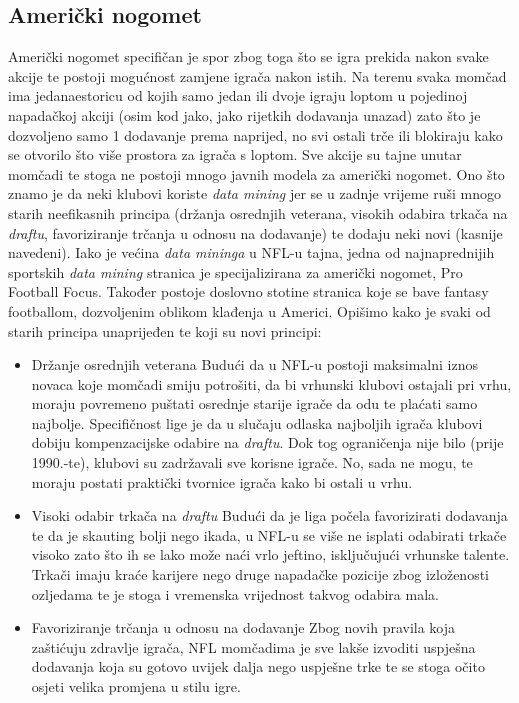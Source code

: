 \documentclass{ferseminar}
\begin{document}
\subsection{Američki nogomet}
Američki nogomet specifičan je spor zbog toga što se igra prekida nakon svake akcije te postoji mogućnost zamjene igrača nakon istih. Na terenu svaka momčad ima jedanaestoricu od kojih samo jedan ili dvoje igraju loptom u pojedinoj napadačkoj akciji (osim kod jako, jako rijetkih dodavanja unazad) zato što je dozvoljeno samo 1 dodavanje prema naprijed, no svi ostali trče ili blokiraju kako se otvorilo što više prostora za igrača s loptom. Sve akcije su tajne unutar momčadi te stoga ne postoji mnogo javnih modela za američki nogomet. Ono što znamo je da neki klubovi koriste \textit{data mining} jer se u zadnje vrijeme ruši mnogo starih neefikasnih principa (držanja osrednjih veterana, visokih odabira trkača na \textit{draftu}, favoriziranje trčanja u odnosu na dodavanje) te dodaju neki novi (kasnije navedeni).
\newline
Iako je većina \textit{data mininga} u NFL-u tajna, jedna od najnaprednijih sportskih \textit{data mining} stranica je specijalizirana za američki nogomet, Pro Football Focus. Također postoje doslovno stotine stranica koje se bave fantasy footballom, dozvoljenim oblikom klađenja u Americi.
\newline
Opišimo kako je svaki od starih principa unaprijeđen te koji su novi principi:
\begin{itemize}
	\item Držanje osrednjih veterana \cite{ringer_age}
	\newline
	Budući da u NFL-u postoji maksimalni iznos novaca koje momčadi smiju potrošiti, da bi vrhunski klubovi ostajali pri vrhu, moraju povremeno puštati osrednje starije igrače da odu te plaćati samo najbolje. Specifičnost lige je da u slučaju odlaska najboljih igrača klubovi dobiju kompenzacijske odabire na \textit{draftu}. Dok tog ograničenja nije bilo (prije 1990.-te), klubovi su zadržavali sve korisne igrače. No, sada ne mogu, te moraju postati praktički tvornice igrača kako bi ostali u vrhu.
	\item Visoki odabir trkača na \textit{draftu} \cite{RBs}
	\newline
	Budući da je liga počela favorizirati dodavanja te da je skauting bolji nego ikada, u NFL-u se više ne isplati odabirati trkače visoko zato što ih se lako može naći vrlo jeftino, isključujući vrhunske talente. Trkači imaju kraće karijere nego druge napadačke pozicije zbog izloženosti ozljedama te je stoga i vremenska vrijednost takvog odabira mala. \cite{RBs2}
	\item Favoriziranje trčanja u odnosu na dodavanje
	\newline
	Zbog novih pravila koja zaštićuju zdravlje igrača, NFL momčadima je sve lakše izvoditi uspješna dodavanja koja su gotovo uvijek dalja nego uspješne trke te se stoga očito osjeti velika promjena u stilu igre. \cite{RBs}
\end{itemize}
\end{document}
